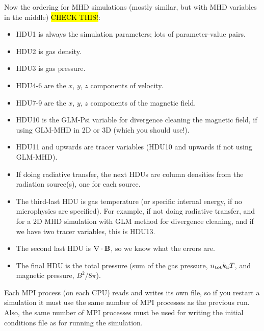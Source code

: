 \documentclass[a4paper,11pt]{report}
\begin{document}
Now the ordering for MHD simulations (mostly similar, but with MHD variables in the middle) \hl{CHECK THIS!}:
\begin{itemize}
\item HDU1 is always the simulation parameters; lots of parameter-value pairs.
\item HDU2 is gas density.
\item HDU3 is gas pressure.
\item HDU4-6 are the $x$, $y$, $z$ components of velocity.
\item HDU7-9 are the $x$, $y$, $z$ components of the magnetic field. 
\item HDU10 is the GLM-Psi variable for divergence cleaning the magnetic field, if using GLM-MHD in 2D or 3D (which you should use!).
\item HDU11 and upwards are tracer variables (HDU10 and upwards if not using GLM-MHD).
\item If doing radiative transfer, the next HDUs are column densities from the radiation source(s), one for each source.
\item The third-last HDU is gas temperature (or specific internal energy, if no microphysics are specified).
  For example, if not doing radiative transfer, and for a 2D MHD simulation with GLM method for divergence cleaning, and if we have two tracer variables, this is HDU13.
\item The second last HDU is $\mathbf{\nabla}\cdot\mathbf{B}$, so we know what the errors are.
\item The final HDU is the total pressure (sum of the gas pressure, $n_{\mathrm{tot}}k_{\mathrm{\textsc{b}}}T$, and magnetic pressure, $B^2/8\pi$).
\end{itemize}

Each MPI process (on each CPU) reads and writes its own file, so if you restart a simulation it must use the same number of MPI processes as the previous run.
Also, the same number of MPI processes must be used for writing the initial conditions file as for running the simulation.



\end{document}
